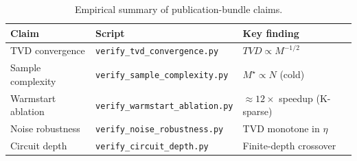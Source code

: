 \begin{table}[t]
\centering
\caption{Empirical summary of publication-bundle claims.}
\label{tab:empirical-summary}
\begin{tabular}{lll}
\toprule
Claim & Script & Key finding \\
\midrule
TVD convergence & \texttt{verify_tvd_convergence.py} & $TVD \propto M^{-1/2}$ \\
Sample complexity & \texttt{verify_sample_complexity.py} & $M^\star \propto N$ (cold) \\
Warmstart ablation & \texttt{verify_warmstart_ablation.py} & $\approx 12\times$ speedup (K-sparse) \\
Noise robustness & \texttt{verify_noise_robustness.py} & TVD monotone in $\eta$ \\
Circuit depth & \texttt{verify_circuit_depth.py} & Finite-depth crossover \\
\bottomrule
\end{tabular}
\end{table}
